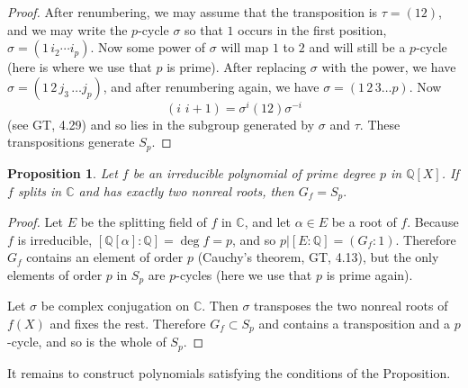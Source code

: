 \documentclass[a4paper,11pt,final,openany]{memoir}
\newtheorem{proposition}[X]{Proposition}
\theoremstyle{nonumberplain}
\newtheorem{proof}{Proof.}
\begin{document}
\begin{proof}
After renumbering, we may assume that the transposition is $\tau=(12)$, and we
may write the $p$-cycle $\sigma$ so that $1$ occurs in the first position,
$\sigma=(1\,i_{2}\cdots i_{p})$. Now some power of $\sigma$ will map $1$ to
$2$ and will still be a $p$-cycle (here is where we use that $p$ is prime).
After replacing $\sigma$ with the power, we have $\sigma=(1\,2\,j_{3}\,\ldots
j_{p})$, and after renumbering again, we have $\sigma=(1\,2\,3\ldots p).$ Now%
\[
(i\,\,i+1)=\sigma^{i}(12)\sigma^{-i}%
\]
(see GT, 4.29) and so lies in the subgroup generated by $\sigma$ and
$\tau$. These transpositions generate $S_{p}$.
\end{proof}

\begin{proposition}
\label{cg13} Let $f$ be an irreducible polynomial of prime degree $p$ in
$\mathbb{Q}[X]$. If $f$ splits in $\mathbb{C}$ and has exactly two nonreal
roots, then $G_{f}=S_{p}.$
\end{proposition}

\begin{proof}
Let $E$ be the splitting field of $f$ in $\mathbb{C}{}$, and let $\alpha\in E$
be a root of $f$. Because $f$ is irreducible, $[\mathbb{Q}[\alpha
]\colon\mathbb{Q}]=\deg f=p$, and so $p|[E\colon\mathbb{Q}]=(G_{f}\colon1)$.
Therefore $G_{f}$ contains an element of order $p$ (Cauchy's theorem, GT,
4.13), but the only elements of order $p$ in $S_{p}$ are $p$-cycles
(here we use that $p$ is prime again).

Let $\sigma$ be complex conjugation on $\mathbb{C}$. Then $\sigma$ transposes
the two nonreal roots of $f(X)$ and fixes the rest. Therefore $G_{f}\subset
S_{p}$ and contains a transposition and a $p$-cycle, and so is the whole of
$S_{p}$.
\end{proof}

It remains to construct polynomials satisfying the conditions of the Proposition.
\end{document}
